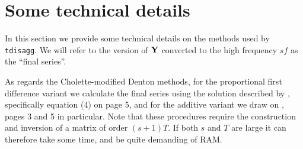 \section{Some technical details}
\label{sec:tdisagg-details}

In this section we provide some technical details on the methods used
by \texttt{tdisagg}. We will refer to the version of $\mathbf{Y}$ converted
to the high frequency $sf$ as the ``final series''.

As regards the Cholette-modified Denton methods, for the proportional
first difference variant we calculate the final series using the
solution described by \cite{difonzo2012}, specifically equation (4) on
page 5, and for the additive variant we draw on \cite{difonzo2003},
pages 3 and 5 in particular.  Note that these procedures require the
construction and inversion of a matrix of order $(s+1)T$. If both $s$
and $T$ are large it can therefore take some time, and be quite
demanding of RAM.

